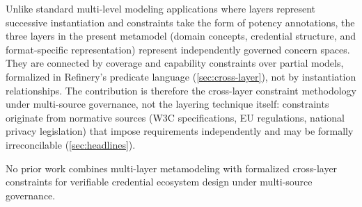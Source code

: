Unlike standard multi-level modeling applications where layers represent successive instantiation and constraints take the form of potency annotations, the three layers in the present metamodel (domain concepts, credential structure, and format-specific representation) represent independently governed concern spaces. They are connected by coverage and capability constraints over partial models, formalized in Refinery's predicate language (\autoref{sec:cross-layer}), not by instantiation relationships. The contribution is therefore the cross-layer constraint methodology under multi-source governance, not the layering technique itself: constraints originate from normative sources (W3C specifications, EU regulations, national privacy legislation) that impose requirements independently and may be formally irreconcilable (\autoref{sec:headlines}).

No prior work combines multi-layer metamodeling with formalized cross-layer constraints for verifiable credential ecosystem design under multi-source governance.
